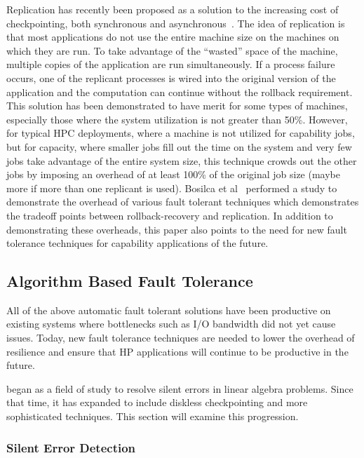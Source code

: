 Replication has recently been proposed as a solution to the increasing cost of 
checkpointing, both synchronous and asynchronous~\cite{Ferreira:2011wg}. The idea of replication is 
that most applications do not use the entire machine size on the machines on which they 
are run. To take advantage of the ``wasted'' space of the machine, multiple copies of 
the application are run simultaneously. If a process failure occurs, one of the 
replicant processes is wired into the original version of the application and the 
computation can continue without the rollback requirement. This solution has been 
demonstrated to have merit for some types of machines, especially those where the 
system utilization is not greater than 50\%. However, for typical HPC deployments, 
where a machine is not utilized for capability jobs, but for capacity, where smaller 
jobs fill out the time on the system and very few jobs take advantage of the entire 
system size, this technique crowds out the other jobs by imposing an overhead of at 
least 100\% of the original job size (maybe more if more than one replicant is used). 
Bosilca et al~\cite{BosilcaINRIARep7950} performed a study to demonstrate the overhead of various fault 
tolerant techniques which demonstrates the tradeoff points between rollback-recovery 
and replication. In addition to demonstrating these overheads, this paper also points 
to the need for new fault tolerance techniques for capability applications of the future.

\subsection{Algorithm Based Fault Tolerance}
\label{subsec:background:types:abft}

All of the above automatic fault tolerant solutions have been productive on existing 
systems where bottlenecks such as I/O bandwidth did not yet cause issues. Today, new 
fault tolerance techniques are needed to lower the overhead of resilience and ensure 
that HP applications will continue to be productive in the future.

\abft began as a field of study to resolve 
silent errors in linear algebra problems. Since that time, it has expanded to 
include diskless checkpointing and more sophisticated techniques. This section 
will examine this progression.

\subsubsection{Silent Error Detection}

